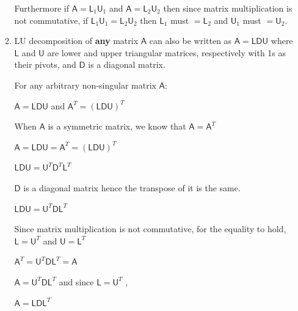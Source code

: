 \documentclass[a4paper, 11pt]{article}
\newcommand{\mat}[1]{\boldsymbol { \mathsf{#1}} }
\begin{document}
\begin{enumerate}
\begin{enumerate}[label=(\alph*)]
Furthermore if $\mat{A} = \mat{L}_{1}\mat{U}_{1}$ and $\mat{A} = \mat{L}_{2}\mat{U}_{2}$ then since matrix multiplication is not commutative, if $\mat{L}_1\mat{U}_1 = \mat{L}_2\mat{U}_2$ then $\mat{L}_1$ must $= \mat{L}_2$ and $\mat{U}_1$ must $= \mat{U}_2$.

\item LU decomposition of \textbf{any} matrix $\mat A$ can also be written as $\mat A = \mat {LDU}$ where $\mat L$ and $\mat U$ are lower and upper triangular matrices, respectively with 1s as their pivots, and $\mat D$ is a diagonal matrix. 

For any arbitrary non-singular matrix $\mat A$: 

$\mat A = \mat{LDU}$ and $\mat A^T = (\mat{LDU})^T$

When $\mat A$ is a symmetric matrix, we know that $\mat A = \mat A^T$

$\mat A = \mat{LDU} = \mat A^T = (\mat{LDU})^T$

$\mat{LDU} = \mat U^T \mat D^T \mat L^T$

$\mat D $ is a diagonal matrix hence the transpose of it is the same.

$\mat{LDU} = \mat U^T \mat D \mat L^T$

Since matrix multiplication is not commutative, for the equality to hold, $\mat L = \mat U^T$ and $\mat U = \mat L^T$

$\mat A^T = \mat U^T \mat D \mat L^T = \mat A$

$\mat A = \mat U^T \mat D \mat L^T$ and since $\mat L = \mat U^T$ , 

$\mat A = \mat L \mat D \mat L^T$

\end{enumerate}
\end{enumerate}

\newpage
\end{document}
